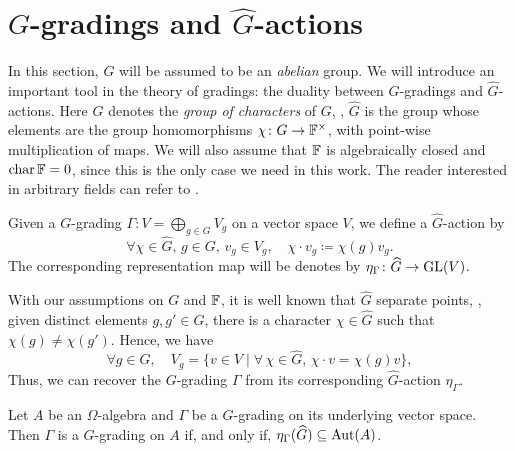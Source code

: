 \section{\texorpdfstring{$G$}{G}-gradings and \texorpdfstring{$\widehat{G}$}{G-hat}-actions}\label{sec:g-hat-action}

In this section, $G$ will be assumed to be an \emph{abelian} group. 
We will introduce an important tool in the theory of gradings: the duality between $G$-gradings and $\widehat G$-actions. 
Here $\widehat G$ denotes the \emph{group of characters} of $G$, \ie, $\widehat G$ is the group whose elements are the group homomorphisms $\chi\colon G \to \mathbb{F}^\times$, with point-wise multiplication of maps. 
We will also assume that $\mathbb{F}$ is algebraically closed and $\operatorname{char} \mathbb{F} = 0$, since this is the only case we need in this work. 
The reader interested in arbitrary fields can refer to \cite{livromicha}. 


\begin{defi}
    Given a $G$-grading $\Gamma : V = \bigoplus_{g\in G} V_g$ on a vector space $V$, we define a $\widehat G$-action by
    \[
        \forall \chi \in \widehat G, \, g\in G, \, v_g \in V_g, \quad \chi \cdot v_g \coloneqq \chi(g) v_g. 
    \]
    The corresponding representation map will be denotes by $\eta_\Gamma \colon \widehat G \to \operatorname{GL} (V)$. 
\end{defi}

With our assumptions on $G$ and $\mathbb{F}$, it is well known that $\widehat G$ separate points, \ie, given distinct elements $g, g'\in G$, there is a character $\chi \in \widehat G$ such that $\chi(g) \neq \chi(g')$. 
Hence, we have 
\[
    \forall g\in G, \quad V_g = \{ v\in V \mid \forall\, \chi \in \widehat G, \, \chi \cdot v = \chi(g)v \},
\]
Thus, we can recover the $G$-grading $\Gamma$ from its corresponding $\widehat G$-action $\eta_\Gamma$. 


\begin{prop}\label{prop:g-hat-Aut-A}
	Let $A$ be an $\Omega$-algebra and $\Gamma$ be a $G$-grading on its underlying vector space.
	Then $\Gamma$ is a $G$-grading on $A$ 
	if, and only if, $\eta_\Gamma(\widehat G) \subseteq \operatorname{Aut}(A)$.
\end{prop}

